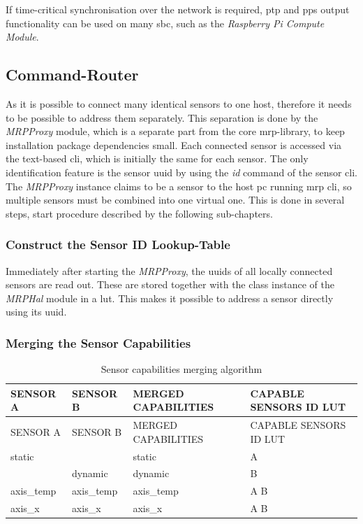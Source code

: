 If time-critical synchronisation over the network is required, \gls{ptp}
and \gls{pps} output functionality  can be used on many
\gls{sbc}, such as the \emph{Raspberry Pi Compute Module}.

\hypertarget{command-router}{%
\subsection{Command-Router}\label{command-router}}

As it is possible to connect many identical sensors to one host,
therefore it needs to be possible to address them separately. This
separation is done by the \emph{MRPProxy} module, which is a separate
part from the core \gls{mrp}-library, to keep installation package
dependencies small. Each connected sensor is accessed via the text-based
\gls{cli}, which is initially the same for each sensor. The only
identification feature is the sensor \gls{uuid} by using the \emph{id}
command of the sensor \gls{cli}. The \emph{MRPProxy} instance claims to
be a sensor to the host \gls{pc} running \gls{mrp} \gls{cli}, so
multiple sensors must be combined into one virtual one. This is done in
several steps, start procedure described by the following sub-chapters.

\hypertarget{construct-the-sensor-id-lookup-table}{%
\subsubsection{Construct the Sensor ID
Lookup-Table}\label{construct-the-sensor-id-lookup-table}}

Immediately after starting the \emph{MRPProxy}, the \gls{uuid}s of all
locally connected sensors are read out. These are stored together with
the class instance of the \emph{MRPHal} module in a \gls{lut}. This
makes it possible to address a sensor directly using its \gls{uuid}.

\hypertarget{merging-the-sensor-capabilities}{%
\subsubsection{Merging the Sensor
Capabilities}\label{merging-the-sensor-capabilities}}

\begin{longtable}[]{@{}llll@{}}
\caption{Sensor capabilities merging algorithm
\label{Sensor_capabilities_merging_algorithm.csv}}\tabularnewline
\toprule
SENSOR A & SENSOR B & MERGED CAPABILITIES & CAPABLE SENSORS ID
LUT\tabularnewline
\midrule
\endfirsthead
\toprule
SENSOR A & SENSOR B & MERGED CAPABILITIES & CAPABLE SENSORS ID
LUT\tabularnewline
\midrule
\endhead
static & & static & A\tabularnewline
& dynamic & dynamic & B\tabularnewline
axis\_temp & axis\_temp & axis\_temp & A B\tabularnewline
axis\_x & axis\_x & axis\_x & A B\tabularnewline
\bottomrule
\end{longtable}

